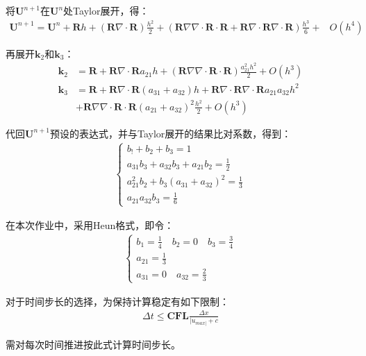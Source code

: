 \documentclass[12pt, a4paper]{article}
\begin{document}
将$\mathbf{U}^{n+1}$在$\mathbf{U}^{n}$处Taylor展开，得：
\begin{align}
    \mathbf{U}^{n+1} = \mathbf{U}^n + \mathbf{R}h + (\mathbf{R}\nabla\cdot\mathbf{R})\frac{h^2}{2}+(\mathbf{R}\nabla\nabla\cdot\mathbf{R}\cdot\mathbf{R}+\mathbf{R}\nabla\cdot\mathbf{R}\nabla\cdot\mathbf{R})\frac{h^3}{6} + &O(h^4)
\end{align}

再展开$\mathbf{k}_2$和$\mathbf{k}_3$：
\begin{align}
    \mathbf{k}_2 &=  \mathbf{R} + \mathbf{R}\nabla\cdot\mathbf{R}a_{21}h + (\mathbf{R}\nabla\nabla\cdot\mathbf{R}\cdot\mathbf{R})\frac{a_{21}^2h^2}{2}+O(h^3)\\
    \mathbf{k}_3 &= \mathbf{R} + \mathbf{R}\nabla\cdot\mathbf{R}(a_{31}+a_{32})h + \mathbf{R}\nabla\cdot\mathbf{R}\nabla\cdot\mathbf{R}a_{21}a_{32}h^2\\
    &+\mathbf{R}\nabla\nabla\cdot\mathbf{R}\cdot\mathbf{R}(a_{21}+a_{32})^2\frac{h^2}{2}+O(h^3)
\end{align}

代回$\mathbf{U}^{n+1}$预设的表达式，并与Taylor展开的结果比对系数，得到：
\begin{align}
    \begin{cases}
        b_!+b_2+b_3=1\\
        a_{31}b_3+a_32b_3+a_21b_2=\frac{1}{2}\\
        a_{21}^2b_{2}+b_{3}(a_{31}+a_{32})^2 = \frac{1}{3}\\
        a_{21}a_{32}b_3=\frac{1}{6}
    \end{cases}
\end{align}

在本次作业中，采用Heun格式，即令：
\begin{align}
    \begin{cases}
        b_1=\frac{1}{4}\quad b_2=0 \quad b_3=\frac{3}{4}\\
        a_{21} = \frac{1}{3}\\
        a_{31}=0\quad a_{32} = \frac{2}{3}
    \end{cases}
\end{align}

对于时间步长的选择，为保持计算稳定有如下限制：
\begin{align}
    \Delta t \leqslant\mathbf{CFL}\frac{\Delta x}{|u_{max|}+c}
\end{align}

需对每次时间推进按此式计算时间步长。
\end{document}
